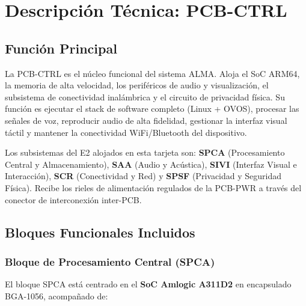 \chapter{Descripción Técnica: PCB-CTRL}
\label{chap:pcb_ctrl}

\section{Función Principal}
\label{sec:ctrl_funcion}

La PCB-CTRL es el núcleo funcional del sistema ALMA. Aloja el SoC ARM64, la memoria de alta velocidad, los periféricos de audio y visualización, el subsistema de conectividad inalámbrica y el circuito de privacidad física. Su función es ejecutar el stack de software completo (Linux + OVOS), procesar las señales de voz, reproducir audio de alta fidelidad, gestionar la interfaz visual táctil y mantener la conectividad WiFi/Bluetooth del dispositivo.

Los subsistemas del E2 alojados en esta tarjeta son: \textbf{SPCA} (Procesamiento Central y Almacenamiento), \textbf{SAA} (Audio y Acústica), \textbf{SIVI} (Interfaz Visual e Interacción), \textbf{SCR} (Conectividad y Red) y \textbf{SPSF} (Privacidad y Seguridad Física). Recibe los rieles de alimentación regulados de la PCB-PWR a través del conector de interconexión inter-PCB.

\section{Bloques Funcionales Incluidos}
\label{sec:ctrl_bloques}

\subsection{Bloque de Procesamiento Central (SPCA)}

El bloque SPCA está centrado en el \textbf{SoC Amlogic A311D2} en encapsulado BGA-1056, acompañado de:

